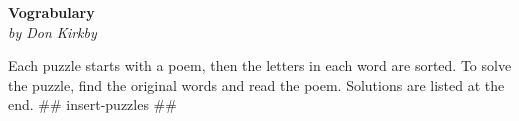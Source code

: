 \documentclass[letterpaper,14pt]{extarticle}
\begin{document}
   \begin{center}
      \Large\textbf{Vograbulary}\\
      \large\textit{by Don Kirkby}
   \end{center}
{\fontsize{3mm}{0.1em}\selectfont
Each puzzle starts with a poem, then the letters in each word are sorted. To
solve the puzzle, find the original words and read the poem. Solutions are
listed at the end.
}
## insert-puzzles ##
\end{document}
